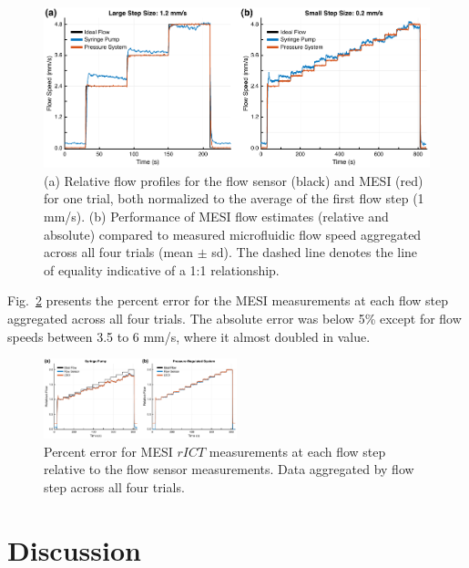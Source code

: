 \documentclass[12pt]{spieman}
\begin{document}
\begin{spacing}{2}
\begin{figure}
    \includegraphics[width=\textwidth]{Figure4.pdf}
    \caption {
        (a) Relative flow profiles for the flow sensor (black) and MESI (red) for one trial, both normalized to the average of the first flow step (1 mm/s). (b) Performance of MESI flow estimates (relative and absolute) compared to measured microfluidic flow speed aggregated across all four trials (mean $\pm$ sd). The dashed line denotes the line of equality indicative of a 1:1 relationship.
    }
    \label{fig:mesi_flow}
\end{figure}

Fig.~\ref{fig:mesi_error} presents the percent error for the MESI measurements at each flow step aggregated across all four trials. The absolute error was below 5\% except for flow speeds between 3.5 to 6 mm/s, where it almost doubled in value.

\begin{figure}
    \centering
    \includegraphics[width=0.5\textwidth]{Figure5.pdf}
    \caption {
        Percent error for MESI $rICT$ measurements at each flow step relative to the flow sensor measurements.  Data aggregated by flow step across all four trials.
    }
    \label{fig:mesi_error}
\end{figure}


\section{Discussion}
\label{sect:discussion}


\end{spacing}
\end{document}
